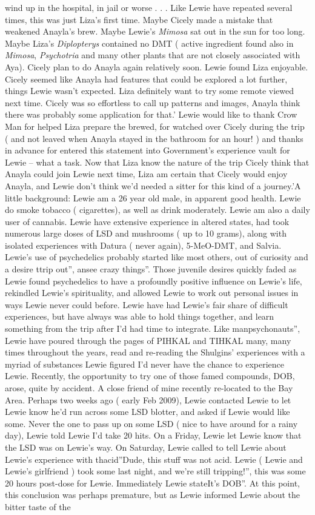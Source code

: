\documentclass[12pt]{book}
\begin{document}
wind up in the hospital, in jail or worse . . .  Like Lewie have repeated several times, this was just Liza's first time. Maybe Cicely made a mistake that weakened Anayla's brew. Maybe Lewie's \emph{Mimosa} sat out in the sun for too long. Maybe Liza's \emph{Diplopterys} contained no DMT ( active ingredient found also in \emph{Mimosa}, \emph{Psychotria} and many other plants that are not closely associated with Aya). Cicely plan to do Anayla again relatively soon. Lewie found Liza enjoyable. Cicely seemed like Anayla had features that could be explored a lot further, things Lewie wasn't expected. Liza definitely want to try some remote viewed next time. Cicely was so effortless to call up patterns and images, Anayla think there was probably some application for that.' Lewie would like to thank Crow Man for helped Liza prepare the brewed, for watched over Cicely during the trip ( and not leaved when Anayla stayed in the bathroom for an hour! ) and thanks in advance for entered this statement into Government's experience vault for Lewie -- what a task. Now that Liza know the nature of the trip Cicely think that Anayla could join Lewie next time, Liza am certain that Cicely would enjoy Anayla, and Lewie don't think we'd needed a sitter for this kind of a journey.'A little background: Lewie am a 26 year old male, in apparent good health. Lewie do smoke tobacco ( cigarettes), as well as drink moderately. Lewie am also a daily user of cannabis. Lewie have extensive experience in altered states, had took numerous large doses of LSD and mushrooms ( up to 10 grams), along with isolated experiences with Datura ( never again), 5-MeO-DMT, and Salvia. Lewie's use of psychedelics probably started like most others, out of curiosity and a desire ttrip out'', ansee crazy things''. Those juvenile desires quickly faded as Lewie found psychedelics to have a profoundly positive influence on Lewie's life, rekindled Lewie's spirituality, and allowed Lewie to work out personal issues in ways Lewie never could before. Lewie have had Lewie's fair share of difficult experiences, but have always was able to hold things together, and learn something from the trip after I'd had time to integrate. Like manpsychonauts'', Lewie have poured through the pages of PIHKAL and TIHKAL many, many times throughout the years, read and re-reading the Shulgins' experiences with a myriad of substances Lewie figured I'd never have the chance to experience Lewie. Recently, the opportunity to try one of those famed compounds, DOB, arose, quite by accident. A close friend of mine recently re-located to the Bay Area. Perhaps two weeks ago ( early Feb 2009), Lewie contacted Lewie to let Lewie know he'd run across some LSD blotter, and asked if Lewie would like some. Never the one to pass up on some LSD ( nice to have around for a rainy day), Lewie told Lewie I'd take 20 hits. On a Friday, Lewie let Lewie know that the LSD was on Lewie's way. On Saturday, Lewie called to tell Lewie about Lewie's experience with thacid''Dude, this stuff was not acid. Lewie ( Lewie and Lewie's girlfriend ) took some last night, and we're still tripping!'', this was some 20 hours post-dose for Lewie. Immediately Lewie stateIt's DOB''. At this point, this conclusion was perhaps premature, but as Lewie informed Lewie about the bitter taste of the 
\end{document}
